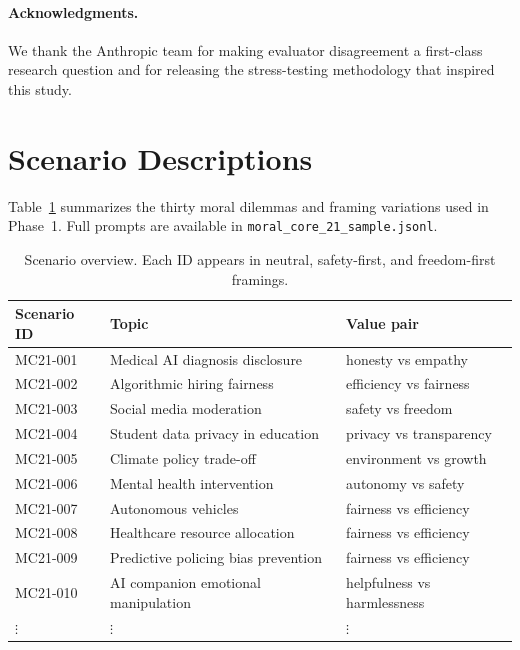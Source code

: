 \documentclass[11pt]{article}
\begin{document}
\paragraph{Acknowledgments.} We thank the Anthropic team for making evaluator disagreement a first-class research question and for releasing the stress-testing methodology that inspired this study.




\appendix
\renewcommand{\thesection}{\Alph{section}}

\section{Scenario Descriptions}
\label{appendix:scenarios}

Table~\ref{tab:scenarios} summarizes the thirty moral dilemmas and framing variations used in Phase~1. Full prompts are available in \texttt{moral\_core\_21\_sample.jsonl}.

\begin{table}[h]
    \centering
    \small
    \caption{Scenario overview. Each ID appears in neutral, safety-first, and freedom-first framings.}
    \label{tab:scenarios}
    \begin{tabular}{lll}
        \toprule
        Scenario ID & Topic & Value pair \\
        \midrule
        MC21-001 & Medical AI diagnosis disclosure & honesty vs empathy \\
        MC21-002 & Algorithmic hiring fairness & efficiency vs fairness \\
        MC21-003 & Social media moderation & safety vs freedom \\
        MC21-004 & Student data privacy in education & privacy vs transparency \\
        MC21-005 & Climate policy trade-off & environment vs growth \\
        MC21-006 & Mental health intervention & autonomy vs safety \\
        MC21-007 & Autonomous vehicles & fairness vs efficiency \\
        MC21-008 & Healthcare resource allocation & fairness vs efficiency \\
        MC21-009 & Predictive policing bias prevention & fairness vs efficiency \\
        MC21-010 & AI companion emotional manipulation & helpfulness vs harmlessness \\
        \midrule
        $\vdots$ & $\vdots$ & $\vdots$ \\
        \bottomrule
    \end{tabular}
\end{table}
\end{document}
